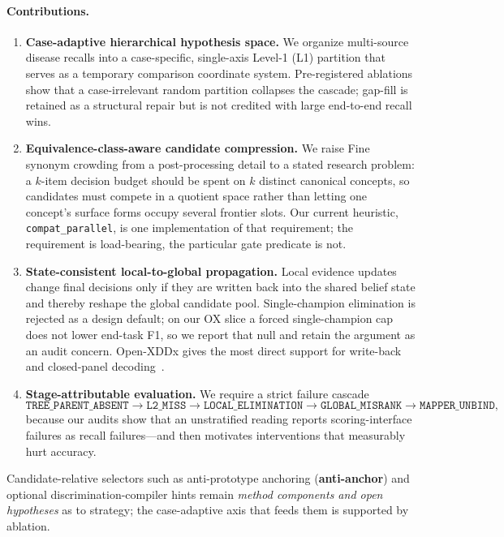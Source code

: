 \paragraph{Contributions.}
\begin{enumerate}
  \item \textbf{Case-adaptive hierarchical hypothesis space.}
  We organize multi-source disease recalls into a case-specific, single-axis Level-1 (L1) partition that serves as a temporary comparison coordinate system.
  Pre-registered ablations show that a case-irrelevant random partition collapses the cascade; gap-fill is retained as a structural repair but is not credited with large end-to-end recall wins.
  \item \textbf{Equivalence-class-aware candidate compression.}
  We raise Fine synonym crowding from a post-processing detail to a stated research problem: a $k$-item decision budget should be spent on $k$ distinct canonical concepts, so candidates must compete in a quotient space rather than letting one concept's surface forms occupy several frontier slots.
  Our current heuristic, \texttt{compat\_parallel}, is one implementation of that requirement; the requirement is load-bearing, the particular gate predicate is not.
  \item \textbf{State-consistent local-to-global propagation.}
  Local evidence updates change final decisions only if they are written back into the shared belief state and thereby reshape the global candidate pool.
  Single-champion elimination is rejected as a design default; on our OX slice a forced single-champion cap does not lower end-task F1, so we report that null and retain the argument as an audit concern.
  Open-XDDx gives the most direct support for write-back and closed-panel decoding~\cite{dualinf2025}.
  \item \textbf{Stage-attributable evaluation.}
  We require a strict failure cascade
  \[
  \texttt{TREE\_PARENT\_ABSENT}
  \rightarrow
  \texttt{L2\_MISS}
  \rightarrow
  \texttt{LOCAL\_ELIMINATION}
  \rightarrow
  \texttt{GLOBAL\_MISRANK}
  \rightarrow
  \texttt{MAPPER\_UNBIND},
  \]
  because our audits show that an unstratified reading reports scoring-interface failures as recall failures---and then motivates interventions that measurably hurt accuracy.
\end{enumerate}

Candidate-relative selectors such as anti-prototype anchoring (\textbf{anti-anchor}) and optional discrimination-compiler hints remain \emph{method components and open hypotheses} as to strategy; the case-adaptive axis that feeds them is supported by ablation.

